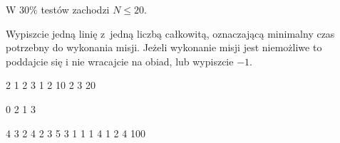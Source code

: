 \smallskip
W $30\%$ testów zachodzi $N \le 20$.

Wypiszcie jedną linię z~jedną liczbą całkowitą, oznaczającą minimalny czas potrzebny do wykonania misji.
Jeżeli wykonanie misji jest niemożliwe to poddajcie się i nie wracajcie na obiad, lub wypiszcie $-1$.



 2 1 2 3
1 2 10
2 3 20
\sampleEND


\bigskip


 0 2 1 3
\sampleEND


\bigskip


 4 3 2 4
2 3 5
3 1 1
1 4 1
2 4 100
\sampleEND


